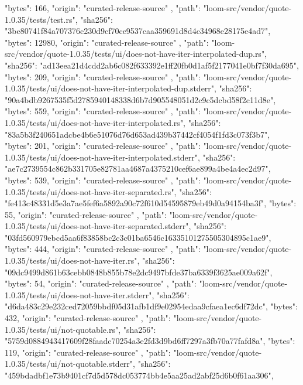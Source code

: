 {{      "bytes": 166,
      "origin": "curated-release-source"
    },
    {
      "path": "loom-src/vendor/quote-1.0.35/tests/test.rs",
      "sha256": "3be80741f84a707376c230d9cf70ce9537caa359691d8d4c34968e28175e4ad7",
      "bytes": 12980,
      "origin": "curated-release-source"
    },
    {
      "path": "loom-src/vendor/quote-1.0.35/tests/ui/does-not-have-iter-interpolated-dup.rs",
      "sha256": "ad13eea21d4cdd2ab6c082f633392e1ff20fb0d1af5f2177041e0bf7f30da695",
      "bytes": 209,
      "origin": "curated-release-source"
    },
    {
      "path": "loom-src/vendor/quote-1.0.35/tests/ui/does-not-have-iter-interpolated-dup.stderr",
      "sha256": "90a4bdb9267535f5d2785940148338d6b7d905548051d2c9c5dcbd58f2c11d8e",
      "bytes": 559,
      "origin": "curated-release-source"
    },
    {
      "path": "loom-src/vendor/quote-1.0.35/tests/ui/does-not-have-iter-interpolated.rs",
      "sha256": "83a5b3f240651adcbe4b6e51076d76d653ad439b37442cf4054f1fd3c073f3b7",
      "bytes": 201,
      "origin": "curated-release-source"
    },
    {
      "path": "loom-src/vendor/quote-1.0.35/tests/ui/does-not-have-iter-interpolated.stderr",
      "sha256": "ae7c2739554c862b331705e82781aa4687a4375210cef6ae899a4be4a4ec2d97",
      "bytes": 539,
      "origin": "curated-release-source"
    },
    {
      "path": "loom-src/vendor/quote-1.0.35/tests/ui/does-not-have-iter-separated.rs",
      "sha256": "fe413c48331d5e3a7ae5fef6a5892a90c72f610d54595879eb49d0a94154ba3f",
      "bytes": 55,
      "origin": "curated-release-source"
    },
    {
      "path": "loom-src/vendor/quote-1.0.35/tests/ui/does-not-have-iter-separated.stderr",
      "sha256": "03fd560979ebcd5aa6f83858bc2c3c01ba6546c16335101275505304895c1ae9",
      "bytes": 444,
      "origin": "curated-release-source"
    },
    {
      "path": "loom-src/vendor/quote-1.0.35/tests/ui/does-not-have-iter.rs",
      "sha256": "09dc9499d861b63cebb0848b855b78e2dc9497bfde37ba6339f3625ae009a62f",
      "bytes": 54,
      "origin": "curated-release-source"
    },
    {
      "path": "loom-src/vendor/quote-1.0.35/tests/ui/does-not-have-iter.stderr",
      "sha256": "d6da483c29e232ced72059bbdf05d31afb1df9e02954edaa9cfaea1ec6df72dc",
      "bytes": 432,
      "origin": "curated-release-source"
    },
    {
      "path": "loom-src/vendor/quote-1.0.35/tests/ui/not-quotable.rs",
      "sha256": "5759d0884943417609f28faadc70254a3e2fd3d9bd6ff7297a3fb70a77fafd8a",
      "bytes": 119,
      "origin": "curated-release-source"
    },
    {
      "path": "loom-src/vendor/quote-1.0.35/tests/ui/not-quotable.stderr",
      "sha256": "459bdadbf1e73b9401cf7d5d578dc053774bb4e5aa25ad2abf25d6b0f61aa306",
}}
